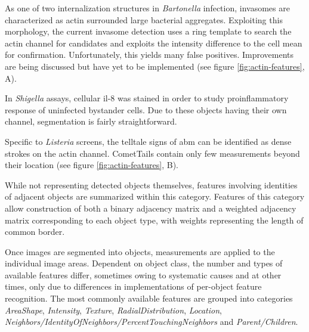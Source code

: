\begin{description}[leftmargin=0.5cm]
\item[Invasomes:] As one of two internalization structures in \textit{Bartonella} infection, invasomes are characterized as actin surrounded large bacterial aggregates. Exploiting this morphology, the current invasome detection uses a ring template to search the actin channel for candidates and exploits the intensity difference to the cell mean for confirmation. Unfortunately, this yields many false positives. Improvements are being discussed but have yet to be implemented (see figure \ref{fig:actin-features}, A).
\item[IL8:] In \textit{Shigella} assays, cellular \gls{il-8} was stained in order to study proinflammatory response of uninfected bystander cells. Due to these objects having their own channel, segmentation is fairly straightforward.
\item[CometTails:] Specific to \textit{Listeria} screens, the telltale signs of \gls{abm} can be identified as dense strokes on the actin channel. CometTails contain only few measurements beyond their location (see figure \ref{fig:actin-features}, B).
\item[Neighbors:] While not representing detected objects themselves, features involving identities of adjacent objects are summarized within this category.  Features of this category allow construction of both a binary adjacency matrix and a weighted adjacency matrix corresponding to each object type, with weights representing the length of common border.
\end{description}

Once images are segmented into objects, measurements are applied to the individual image areas. Dependent on object class, the number and types of available features differ, sometimes owing to systematic causes and at other times, only due to differences in implementations of per-object feature recognition. The most commonly available features are grouped into categories \textit{AreaShape}, \textit{Intensity}, \textit{Texture}, \textit{RadialDistribution}, \textit{Location}, \textit{Neighbors\slash IdentityOfNeighbors\slash Per\-centTouchingNeighbors} and \textit{Parent\slash Children}.

